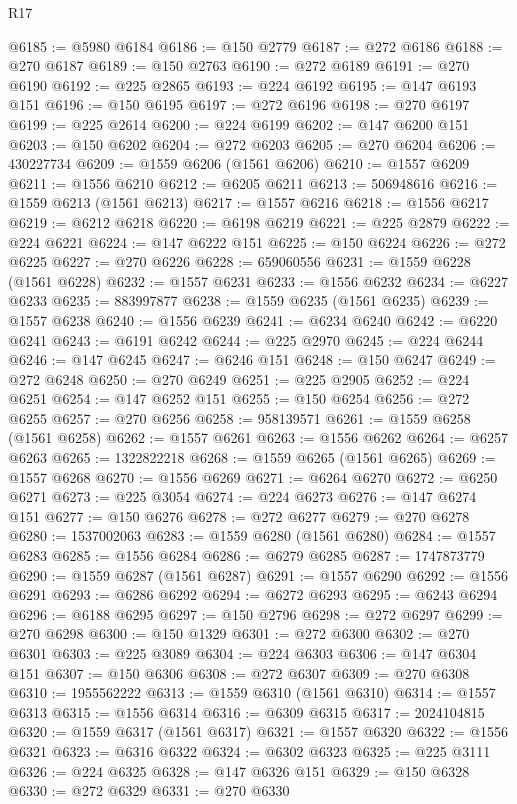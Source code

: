 \begin{lexlean}{R17}
\begin{coremodule}
@6185 := @5980 @6184
@6186 := @150 @2779
@6187 := @272 @6186
@6188 := @270 @6187
@6189 := @150 @2763
@6190 := @272 @6189
@6191 := @270 @6190
@6192 := @225 @2865
@6193 := @224 @6192
@6195 := @147 @6193 @151
@6196 := @150 @6195
@6197 := @272 @6196
@6198 := @270 @6197
@6199 := @225 @2614
@6200 := @224 @6199
@6202 := @147 @6200 @151
@6203 := @150 @6202
@6204 := @272 @6203
@6205 := @270 @6204
@6206 := 430227734
@6209 := @1559 @6206 (@1561 @6206)
@6210 := @1557 @6209
@6211 := @1556 @6210
@6212 := @6205 @6211
@6213 := 506948616
@6216 := @1559 @6213 (@1561 @6213)
@6217 := @1557 @6216
@6218 := @1556 @6217
@6219 := @6212 @6218
@6220 := @6198 @6219
@6221 := @225 @2879
@6222 := @224 @6221
@6224 := @147 @6222 @151
@6225 := @150 @6224
@6226 := @272 @6225
@6227 := @270 @6226
@6228 := 659060556
@6231 := @1559 @6228 (@1561 @6228)
@6232 := @1557 @6231
@6233 := @1556 @6232
@6234 := @6227 @6233
@6235 := 883997877
@6238 := @1559 @6235 (@1561 @6235)
@6239 := @1557 @6238
@6240 := @1556 @6239
@6241 := @6234 @6240
@6242 := @6220 @6241
@6243 := @6191 @6242
@6244 := @225 @2970
@6245 := @224 @6244
@6246 := @147 @6245
@6247 := @6246 @151
@6248 := @150 @6247
@6249 := @272 @6248
@6250 := @270 @6249
@6251 := @225 @2905
@6252 := @224 @6251
@6254 := @147 @6252 @151
@6255 := @150 @6254
@6256 := @272 @6255
@6257 := @270 @6256
@6258 := 958139571
@6261 := @1559 @6258 (@1561 @6258)
@6262 := @1557 @6261
@6263 := @1556 @6262
@6264 := @6257 @6263
@6265 := 1322822218
@6268 := @1559 @6265 (@1561 @6265)
@6269 := @1557 @6268
@6270 := @1556 @6269
@6271 := @6264 @6270
@6272 := @6250 @6271
@6273 := @225 @3054
@6274 := @224 @6273
@6276 := @147 @6274 @151
@6277 := @150 @6276
@6278 := @272 @6277
@6279 := @270 @6278
@6280 := 1537002063
@6283 := @1559 @6280 (@1561 @6280)
@6284 := @1557 @6283
@6285 := @1556 @6284
@6286 := @6279 @6285
@6287 := 1747873779
@6290 := @1559 @6287 (@1561 @6287)
@6291 := @1557 @6290
@6292 := @1556 @6291
@6293 := @6286 @6292
@6294 := @6272 @6293
@6295 := @6243 @6294
@6296 := @6188 @6295
@6297 := @150 @2796
@6298 := @272 @6297
@6299 := @270 @6298
@6300 := @150 @1329
@6301 := @272 @6300
@6302 := @270 @6301
@6303 := @225 @3089
@6304 := @224 @6303
@6306 := @147 @6304 @151
@6307 := @150 @6306
@6308 := @272 @6307
@6309 := @270 @6308
@6310 := 1955562222
@6313 := @1559 @6310 (@1561 @6310)
@6314 := @1557 @6313
@6315 := @1556 @6314
@6316 := @6309 @6315
@6317 := 2024104815
@6320 := @1559 @6317 (@1561 @6317)
@6321 := @1557 @6320
@6322 := @1556 @6321
@6323 := @6316 @6322
@6324 := @6302 @6323
@6325 := @225 @3111
@6326 := @224 @6325
@6328 := @147 @6326 @151
@6329 := @150 @6328
@6330 := @272 @6329
@6331 := @270 @6330

\end{coremodule}
\end{lexlean}
